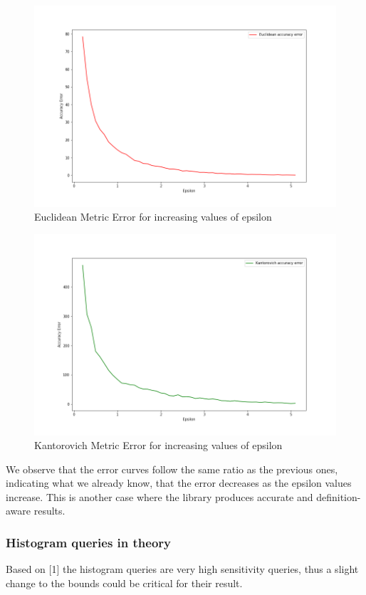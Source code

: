\begin{figure}[!htb]\centering
    \includegraphics[width=1\textwidth]{images/hist_metrics_euclidean.png}
    \caption{Euclidean Metric Error for increasing values of epsilon}
\end{figure}

\begin{figure}[!htb]\centering
    \includegraphics[width=1\textwidth]{images/hist_metrics_kantorovich.png}
    \caption{Kantorovich Metric Error for increasing values of epsilon}
\end{figure}

We observe that the error curves follow the same ratio as the previous ones, indicating what we already know, that the error decreases as the epsilon values increase. This is another case where the library produces accurate and definition-aware results. 

\subsubsection{Histogram queries in theory}
Based on [1] the histogram queries are very high sensitivity queries, thus a slight change to the bounds could be critical for their result. 

